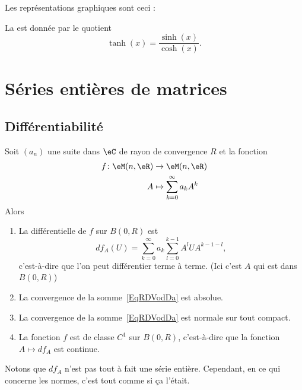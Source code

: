 Les représentations graphiques sont ceci :
\begin{center}
	
\end{center}

La  est donnée par le quotient
\begin{equation}
	\tanh(x)=\frac{ \sinh(x) }{ \cosh(x) }.
\end{equation}

\section{Séries entières de matrices}

\subsection{Différentiabilité}

\begin{proposition} \label{PropAMBXKgV}
	Soit \( (a_n)\) une suite dans \( \eC\) de rayon de convergence \( R\) et la fonction
	\begin{equation}
		\begin{aligned}
			f\colon \eM(n,\eR) & \to \eM(n,\eR)                    \\
			A                  & \mapsto \sum_{k=0}^{\infty}a_kA^k
		\end{aligned}
	\end{equation}
	Alors
	\begin{enumerate}
		\item
		      La différentielle de \( f\) sur \( B(0,R)\) est
		      \begin{equation}    \label{EqRDVodDa}
			      df_A(U)=\sum_{k=0}^{\infty}a_k\sum_{l=0}^{k-1}A^lUA^{k-1-l},
		      \end{equation}
		      c'est-à-dire que l'on peut différentier terme à terme. (Ici c'est \( A\) qui est dans \( B(0,R)\))
		\item
		      La convergence de la somme~\ref{EqRDVodDa} est absolue.
		\item
		      La convergence de la somme~\ref{EqRDVodDa} est normale sur tout compact.
		\item
		      La fonction \( f\) est de classe \( C^1\) sur \( B(0,R)\), c'est-à-dire que la fonction \( A\mapsto df_A\) est continue.
	\end{enumerate}
\end{proposition}
Notons que \( df_A\) n'est pas tout à fait une série entière. Cependant, en ce qui concerne les normes, c'est tout comme si ça l'était.

